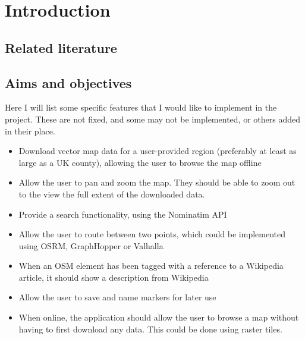 \documentclass[]{final_report}
\begin{document}
\chapter{Introduction}




\section{Related literature}

\section{Aims and objectives}

Here I will list some specific features that I would like to implement in the project. These are not fixed, and some may not be implemented, or others added in their place.

\begin{itemize}
    \item Download vector map data for a user-provided region (preferably at least as large as a UK county), allowing the user to browse the map offline
    \item Allow the user to pan and zoom the map. They should be able to zoom out to the view the full extent of the downloaded data.
    \item Provide a search functionality, using the Nominatim API
    \item Allow the user to route between two points, which could be implemented using OSRM, GraphHopper or Valhalla
    \item When an OSM element has been tagged with a reference to a Wikipedia article, it should show a description from Wikipedia
    \item Allow the user to save and name markers for later use
    \item When online, the application should allow the user to browse a map without having to first download any data. This could be done using raster tiles.
\end{itemize}
\end{document}
